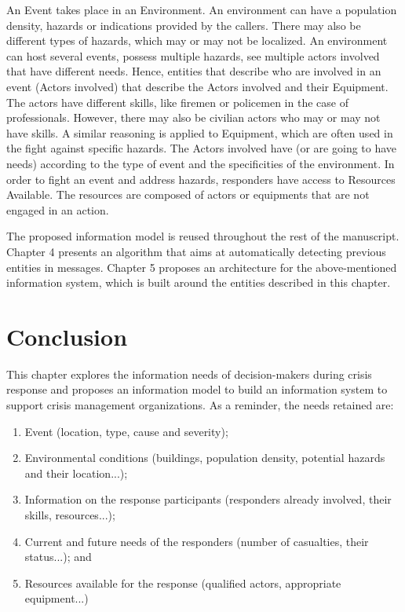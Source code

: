 An Event takes place in an Environment.
An environment can have a population density, hazards or indications provided by the callers.
There may also be different types of hazards, which may or may not be localized.
An environment can host several events, possess multiple hazards, see multiple actors involved
that have different needs.
Hence, entities that describe who are involved in an event (Actors involved) that describe the
Actors involved and their Equipment.
The actors have different skills, like firemen or policemen in the case of professionals.
However, there may also be civilian actors who may or may not have skills.
A similar reasoning is applied to Equipment, which are often used in the fight against specific hazards.
The Actors involved have (or are going to have needs) according to the type of event and the
specificities of the environment.
In order to fight an event and address hazards, responders have access to Resources Available.
The resources are composed of actors or equipments that are not engaged in an action.

The proposed information model is reused throughout the rest of the manuscript.
Chapter 4 presents an algorithm that aims at automatically detecting previous entities in messages.
Chapter 5 proposes an architecture for the above-mentioned information system, which is built around the entities described in this chapter.

\section{Conclusion}
This chapter explores the information needs of decision-makers during crisis response and
proposes an information model to build an information system to support crisis management organizations.
As a reminder, the needs retained are:

\begin{enumerate}
    \item Event (location, type, cause and severity);
    \item Environmental conditions (buildings, population density, potential hazards and their location...);
    \item Information on the response participants (responders already involved, their skills, resources...);
    \item Current and future needs of the responders (number of casualties, their status...); and
    \item Resources available for the response (qualified actors, appropriate equipment...)
\end{enumerate}

